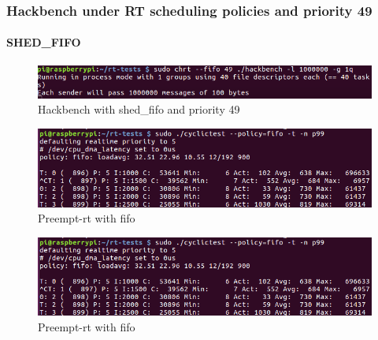 \documentclass[10pt,a4paper]{article}
\begin{document}
\subsubsection{Hackbench under RT scheduling policies and priority 49}
\paragraph{SHED\_FIFO}
\begin{figure}[H]
\includegraphics[width=16cm]{Hackbench2.png}
\caption{Hackbench with shed\_fifo and priority 49}
\end{figure}
\begin{figure}[H]
\includegraphics[width=16cm]{Preempt-Fifo-WithHackbench2.png}
\caption{Preempt-rt with fifo}
\end{figure}
\begin{figure}[H]
\includegraphics[width=16cm]{Preempt-Fifo-WithHackbench2.png}
\caption{Preempt-rt with fifo}
\end{figure}
\end{document}
